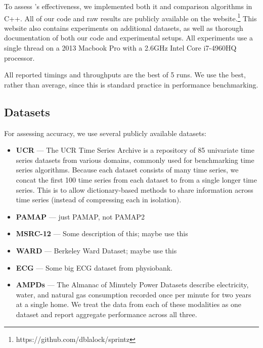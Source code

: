 
To assess \mine's effectiveness, we implemented both it and comparison algorithms in C++. All of our code and raw results are publicly available on the \mine website.\footnote{https://github.com/dblalock/sprintz} This website also contains experiments on additional datasets, as well as thorough documentation of both our code and experimental setups. All experiments use a single thread on a 2013 Macbook Pro with a 2.6GHz Intel Core i7-4960HQ processor.

All reported timings and throughputs are the best of 5 runs. We use the best, rather than average, since this is standard practice in performance benchmarking.

\subsection{Datasets}

For assessing accuracy, we use several publicly available datasets:
\begin{itemize}[leftmargin=4mm]
\item \textbf{UCR} \cite{ucrTimeSeries} --- The UCR Time Series Archive is a repository of 85 univariate time series datasets from various domains, commonly used for benchmarking time series algorithms. Because each dataset consists of many time series, we concat the first 100 time series from each dataset to from a single longer time series. This is to allow dictionary-based methods to share information across time series (instead of compressing each in isolation).
\item \textbf{PAMAP} \cite{pamap} --- just PAMAP, not PAMAP2
\item \textbf{MSRC-12} \cite{msrc} --- Some description of this; maybe use this
\item \textbf{WARD} \cite{ward} --- Berkeley Ward Dataset; maybe use this
\item \textbf{ECG} \cite{physiobank} --- Some big ECG dataset from physiobank.
\item \textbf{AMPDs} \cite{ampds} --- The Almanac of Minutely Power Datasets describe electricity, water, and natural gas consumption recorded once per minute for two years at a single home. We treat the data from each of these modalities as one dataset and report aggregate performance across all three.
\end{itemize}

